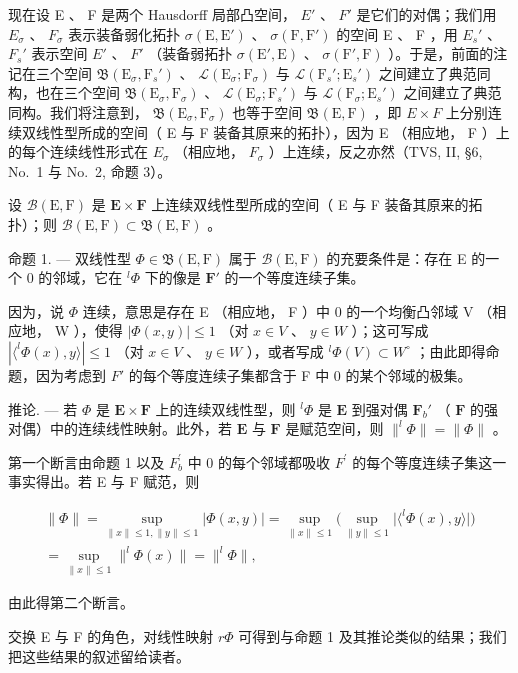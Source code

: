 现在设 E 、 F 是两个 Hausdorff 局部凸空间， \(E'\) 、 \(F'\) 是它们的对偶；我们用 \(E_{\sigma}\) 、 \(F_{\sigma}\) 表示装备弱化拓扑 \(\sigma(\mathrm{E}, \mathrm{E}')\) 、 \(\sigma(\mathrm{F}, \mathrm{F}')\) 的空间 E 、 F ，用 \(E_{s}'\) 、 \(F_{s}'\) 表示空间 \(E'\) 、 \(F'\) （装备弱拓扑 \(\sigma(\mathrm{E}', \mathrm{E})\) 、 \(\sigma(\mathrm{F}', \mathrm{F})\) ）。于是，前面的注记在三个空间 \(\mathfrak{B}(\mathrm{E}_{\sigma}, \mathrm{F}_{s}')\) 、 \(\mathcal{L}(\mathrm{E}_{\sigma}; \mathrm{F}_{\sigma})\) 与 \(\mathcal{L}(\mathrm{F}_{s}'; \mathrm{E}_{s}')\) 之间建立了典范同构，也在三个空间 \(\mathfrak{B}(\mathrm{E}_{\sigma}, \mathrm{F}_{\sigma})\) 、 \(\mathcal{L}(\mathrm{E}_{\sigma}; \mathrm{F}_{s}')\) 与 \(\mathcal{L}(\mathrm{F}_{\sigma}; \mathrm{E}_{s}')\) 之间建立了典范同构。我们将注意到， \(\mathfrak{B}(\mathrm{E}_{\sigma}, \mathrm{F}_{\sigma})\) 也等于空间 \(\mathfrak{B}(\mathrm{E}, \mathrm{F})\) ，即 \(E \times F\) 上分别连续双线性型所成的空间（ E 与 F 装备其原来的拓扑），因为 E （相应地， F ）上的每个连续线性形式在 \(E_{\sigma}\) （相应地， \(F_{\sigma}\) ）上连续，反之亦然（TVS, II, §6, No.~1 与 No.~2, 命题 3）。

设 \(\mathcal{B}(\mathrm{E},\mathrm{F})\) 是 \(\mathbf{E}\times \mathbf{F}\) 上连续双线性型所成的空间（ E 与 F 装备其原来的拓扑）；则 \(\mathcal{B}(\mathrm{E},\mathrm{F})\subset \mathfrak{B}(\mathrm{E},\mathrm{F})\) 。

命题 1. --- 双线性型 \(\Phi \in \mathfrak{B}(\mathrm{E},\mathrm{F})\) 属于 \(\mathcal{B}(\mathrm{E},\mathrm{F})\) 的充要条件是：存在 E 的一个 0 的邻域，它在 \(^l\Phi\) 下的像是 \(\mathbf{F}'\) 的一个等度连续子集。

因为，说 \(\Phi\) 连续，意思是存在 E （相应地， F ）中 0 的一个均衡凸邻域 V （相应地， W ），使得 \(|\Phi(x,y)| \leqslant 1\) （对 \(x \in V\) 、 \(y \in W\) ）；这可写成 \(|\langle^{l}\Phi(x), y \rangle| \leqslant 1\) （对 \(x \in V\) 、 \(y \in W\) ），或者写成 \(^{l}\Phi(V) \subset W^{\circ}\) ；由此即得命题，因为考虑到 \(F'\) 的每个等度连续子集都含于 F 中 0 的某个邻域的极集。

推论. --- 若 \(\Phi\) 是 \(\mathbf{E} \times \mathbf{F}\) 上的连续双线性型，则 \(^l\Phi\) 是 \(\mathbf{E}\) 到强对偶 \(\mathbf{F}_b'\) （ \(\mathbf{F}\) 的强对偶）中的连续线性映射。此外，若 \(\mathbf{E}\) 与 \(\mathbf{F}\) 是赋范空间，则 \(\|^l\Phi\| = \| \Phi \|\) 。

第一个断言由命题 1 以及 \(F_{b}^{\prime}\) 中 0 的每个邻域都吸收 \(F^{\prime}\) 的每个等度连续子集这一事实得出。若 E 与 F 赋范，则

\[
\begin{array}{c} \| \Phi \| = \sup _ {\| x \| \leqslant 1, \| y \| \leqslant 1} | \Phi (x, y) | = \sup _ {\| x \| \leqslant 1} \Big (\sup _ {\| y \| \leqslant 1} \big | \langle^ {l} \Phi (x), y \rangle \big | \Big) \\ = \sup _ {\| x \| \leqslant 1} \| ^ {l} \Phi (x) \| = \| ^ {l} \Phi \|, \end{array}
\]

由此得第二个断言。

交换 E 与 F 的角色，对线性映射 \(r\Phi\) 可得到与命题 1 及其推论类似的结果；我们把这些结果的叙述留给读者。

